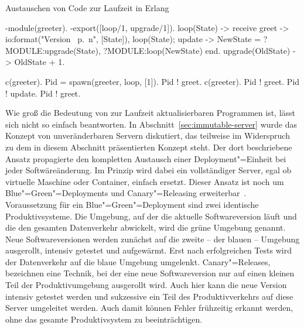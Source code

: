 \begin{program}[!hbt]
\caption{Austauschen von Code zur Laufzeit in Erlang}
\label{prog:erlang-hot-code-loading}
\noindent\begin{minipage}[t]{.49\textwidth}
\lstset{showlines=true}
\begin{ErlangCode}
-module(greeter).
-export([loop/1, upgrade/1]).
loop(State) -> receive
  greet -> 
    io:format("Version ~p.~n",
						  [State]),
    loop(State);
  update ->
    NewState = 
			?MODULE:upgrade(State),
    ?MODULE:loop(NewState)
end.
upgrade(OldState) -> 
  OldState + 1.
\end{ErlangCode}

\end{minipage}\hfill
\begin{minipage}[t]{.48\textwidth}
\lstset{showlines=true}
\begin{ErlangCode}
c(greeter).
Pid = spawn(greeter, loop, [1]).
Pid ! greet. %
c(greeter).
Pid ! greet. %
Pid ! update.
Pid ! greet. %






\end{ErlangCode}

\end{minipage}
\end{program}

Wie groß die Bedeutung von zur Laufzeit aktualisierbaren Programmen ist, lässt sich nicht so einfach beantworten. In Abschnitt~\ref{sec:immutable-server} wurde das Konzept von unveränderbaren Servern diskutiert, das teilweise im Widerspruch zu dem in diesem Abschnitt präsentierten Konzept steht. Der dort beschriebene Ansatz propagierte den kompletten Austausch einer Deployment"=Einheit bei jeder Softwäreänderung. Im Prinzip wird dabei ein vollständiger Server, egal ob virtuelle Maschine oder Container, einfach ersetzt. Dieser Ansatz ist noch um Blue"=Green"=Deployments und Canary"=Releasing erweiterbar~\cite[261-265]{Humble:2010:CDR:1869904}. Voraussetzung für ein Blue"=Green"=Deployment sind zwei identische Produktivsysteme. Die Umgebung, auf der die aktuelle Softwareversion läuft und die den gesamten Datenverkehr abwickelt, wird die grüne Umgebung genannt. Neue Softwareversionen werden zunächst auf die zweite -- der blauen -- Umgebung ausgerollt, intensiv getestet und aufgewärmt. Erst nach erfolgreichen Tests wird der Datenverkehr auf die blaue Umgebung umgelenkt. Canary"=Releases, bezeichnen eine Technik, bei der eine neue Softwareversion nur auf einen kleinen Teil der Produktivumgebung ausgerollt wird. Auch hier kann die neue Version intensiv getestet werden und sukzessive ein Teil des Produktivverkehrs auf diese Server umgeleitet werden. Auch damit können Fehler frühzeitig erkannt werden, ohne das gesamte Produktivsystem zu beeinträchtigen.

